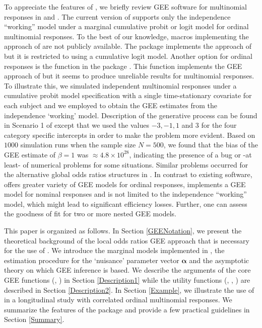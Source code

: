 \documentclass[article,shortnames,nojss]{jss}
\begin{document}
To appreciate the features of , we briefly review GEE software for multinomial responses in  \citep{SAS} and . The current version of  supports only the independence ``working'' model under a marginal cumulative probit or logit model for ordinal multinomial responses. To the best of our knowledge,  macros \citep{Williamson1998,Yu2004} implementing the approach of \cite{Williamson1995} are not publicly available. The  package  \citep{Parsons2013} implements the approach of \cite{Parsons2006} but it is restricted to using a cumulative logit model. Another option for ordinal responses is the function  in the  package  \citep{Hojsgaard2006}. This function implements the GEE approach of \cite{Heagerty1996} but it seems to produce unreliable results for multinomial responses. To illustrate this, we simulated independent multinomial responses under a cumulative probit model specification with a single time-stationary covariate for each subject and we employed  to obtain the GEE estimates from the independence `working' model. Description of the generative process can be found in Scenario 1 of \cite{Touloumis2012} except that we used the values $-3,-1,1$ and $3$ for the four category specific intercepts in order to make the problem more evident. Based on $1000$ simulation runs when the sample size $N=500$, we found that the bias of the GEE estimate of $\beta=1$ was $\approx 4.8 \times 10^{28}$, indicating the presence of a bug or -at least- of numerical problems for some situations. Similar problems occurred for the alternative global odds ratios structures in . In contrast to existing software,  offers greater variety of GEE models for ordinal responses, implements a GEE model for nominal responses and is not limited to the independence ``working'' model, which might lead to significant efficiency losses. Further, one can assess the goodness of fit for two or more nested GEE models.

This paper is organized as follows. In Section \ref{GEENotation}, we present the theoretical background of the local odds ratios GEE approach that is necessary for the use of . We introduce the marginal models implemented in , the estimation procedure for the `nuisance' parameter vector $\boldsymbol \alpha$ and the asymptotic theory on which GEE inference is based. We describe the arguments of the core GEE functions (, ) in Section \ref{Description1} while the utility functions (, , ) are described in Section \ref{Description2}. In Section \ref{Example}, we illustrate the use of  in a longitudinal study with correlated ordinal multinomial responses. We summarize the features of the package and provide a few practical guidelines in Section \ref{Summary}. 
\end{document}
